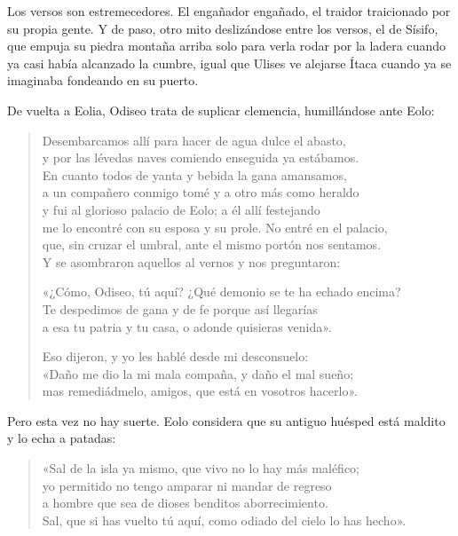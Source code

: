 \documentclass[11pt,a4paper]{article}
\begin{document}
Los versos son estremecedores. El engañador engañado, el traidor traicionado por su propia gente. Y de paso, otro mito deslizándose entre los versos, el de Sísifo, que empuja su piedra montaña arriba solo para verla rodar por la ladera cuando ya casi había alcanzado la cumbre, igual que Ulises ve alejarse Ítaca cuando ya se imaginaba fondeando en su puerto.

De vuelta a Eolia, Odiseo trata de suplicar clemencia, humillándose ante Eolo:

\begin{verse}
Desembarcamos allí para hacer de agua dulce el abasto,\\
y por las lévedas naves comiendo enseguida ya estábamos.\\
En cuanto todos de yanta y bebida la gana amansamos,\\
a un compañero conmigo tomé y a otro más como heraldo\\
y fui al glorioso palacio de Eolo; a él allí festejando\\
me lo encontré con su esposa y su prole. No entré en el palacio,\\
que, sin cruzar el umbral, ante el mismo portón nos sentamos.\\
Y se asombraron aquellos al vernos y nos preguntaron:

«¿Cómo, Odiseo, tú aquí? ¿Qué demonio se te ha echado encima?\\
Te despedimos de gana y de fe porque así llegarías\\
a esa tu patria y tu casa, o adonde quisieras venida».

Eso dijeron, y yo les hablé desde mi desconsuelo:\\
«Daño me dio la mi mala compaña, y daño el mal sueño;\\
mas remediádmelo, amigos, que está en vosotros hacerlo».
\end{verse}

Pero esta vez no hay suerte. Eolo considera que su antiguo huésped está maldito y lo echa a patadas:

\begin{verse}
«Sal de la isla ya mismo, que vivo no lo hay más maléfico;\\
yo permitido no tengo amparar ni mandar de regreso\\
a hombre que sea de dioses benditos aborrecimiento.\\
Sal, que si has vuelto tú aquí, como odiado del cielo lo has hecho».
\end{verse}
\end{document}
